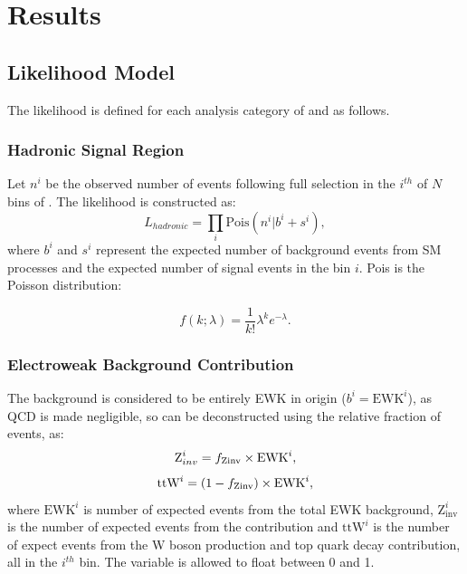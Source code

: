 \chapter{Results}
\label{ch:7}

\ifpdf
    \graphicspath{{Chapter7/Figs/Raster/}{Chapter7/Figs/PDF/}{Chapter7/Figs/}}
\else
    \graphicspath{{Chapter7/Figs/Vector/}{Chapter7/Figs/}}
\fi


\section{Likelihood Model}  %
\label{sec:results_likelihood}
The likelihood is defined for each analysis category of \nb and \nj as follows.

\subsection{Hadronic Signal Region}

Let $n^i$ be the observed number of events 
following full selection in the $i^{th}$ of $N$ bins of \HT. The likelihood is 
constructed as:
% 
\begin{equation}
L_{hadronic} = \prod_i \text{Pois}(n^i | b^i + s^i),
\end{equation}
% 
where $b^i$ and $s^i$ represent the expected number of background events from SM 
processes and the expected number of signal events in the bin $i$. Pois is 
the Poisson distribution:

\begin{equation}
f(k;\lambda) = \frac{1}{k!}\lambda^k e^{-\lambda}.
\end{equation}


\subsection{Electroweak Background Contribution}
The background is considered to be entirely EWK in origin ($b^i = \text{EWK}^i$), as QCD
is made negligible, so can be deconstructed using the relative fraction
of \zinv events, \fzinv as:
% 
\begin{equation}
\text{Z}_{inv}^i = f_{\text{Zinv}} \times \text{EWK}^i,
\label{eq:ewk_frac_z}
\end{equation}
\begin{equation}
\text{ttW}^i = (1-f_{\text{Zinv}}) \times \text{EWK}^i,
\label{eq:ewk_frac_ttw}
\end{equation}
% 
where $\text{EWK}^i$ is number of expected events from the total EWK background,
$\text{Z}_{\text{inv}}^i$ is the number of expected events from the \zinv 
contribution and $\text{ttW}^i$ is the number of expect events from the W boson 
production and top quark decay contribution, all in the $i^{th}$ bin. The variable 
\fzinv is allowed to float between 0 and 1.

